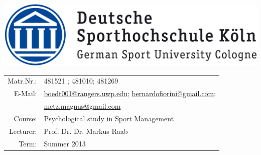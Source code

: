 \begin{titlepage}
\maketitle
     \vspace{.2cm} %
\begin{center}
\includegraphics[scale=0.9]{graphics/logo_dshs.jpg}
\end{center}
\vspace{.2cm} %
\begin{center}

\begin{tabular}{rl}
Matr.Nr.: &481521 ; 481010; 481269\\
E-Mail: &\href{mailto:boedt001@rangers.uwp.edu}{boedt001@rangers.uwp.edu}; \href{mailto:bernardofiorini@gmail.com}{bernardofiorini@gmail.com};\\ &\href{mailto:metz.magnus@gmail.com}{metz.magnus@gmail.com} \\
Course: & Psychological study in Sport Management\\
Lecturer: & Prof. Dr. Dr. Markus Raab\\
Term: & Summer 2013
\end{tabular} 
\end{center}
\thispagestyle{empty} %
\end{titlepage}